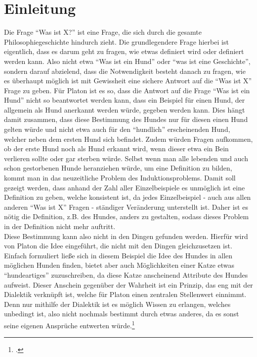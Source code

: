 \section{Einleitung}

Die Frage \enquote{Was ist X?} ist eine Frage, die sich durch die gesamte Philosophiegeschichte hindurch zieht. Die grundlegendere Frage hierbei ist eigentlich, dass es darum geht zu fragen, wie etwas definiert wird oder definiert werden kann. Also nicht etwa \enquote{Was ist ein Hund} oder \enquote{was ist eine Geschichte}, sondern darauf abzielend, dass die Notwendigkeit besteht danach zu fragen, wie es überhaupt möglich ist mit Gewissheit eine sichere Antwort auf die \enquote{Was ist X} Frage zu geben. Für Platon ist es so, dass die Antwort auf die Frage \enquote{Was ist ein Hund} nicht so beantwortet werden kann, dass ein Beispiel für einen Hund, der allgemein als Hund anerkannt werden würde, gegeben werden kann. Dies hängt damit zusammen, dass diese Bestimmung des Hundes nur für diesen einen Hund gelten würde und nicht etwa auch für den \enquote{hundlich} erscheinenden Hund, welcher neben dem ersten Hund sich befindet. Zudem würden Fragen aufkommen, ob der erste Hund noch als Hund erkannt wird, wenn dieser etwa ein Bein verlieren sollte oder gar sterben würde. Selbst wenn man alle lebenden und auch schon gestorbenen Hunde heranziehen würde, um eine Definition zu bilden, kommt man in das neuzeitliche Problem des Induktionsproblems. Damit soll gezeigt werden, dass anhand der Zahl aller Einzelbeispiele es unmöglich ist eine Definition zu geben, welche konsistent ist, da jedes Einzelbeispiel - auch aus allen anderen \enquote{Was ist X} Fragen - ständiger Veränderung unterstellt ist. Daher ist es nötig die Definition, z.B. des Hundes, anders zu gestalten, sodass dieses Problem in der Definition nicht mehr auftritt.\\
Diese Bestimmung kann also nicht in den Dingen gefunden werden. Hierfür wird von Platon die Idee eingeführt, die nicht mit den Dingen gleichzusetzen ist. Einfach formuliert ließe sich in diesem Beispiel die Idee des Hundes in allen möglichen Hunden finden, bietet aber auch Möglichkeiten einer Katze etwas \enquote{hundeartiges} zuzuschreiben, da diese Katze anscheinend Attribute des Hundes aufweist. Dieser Anschein gegenüber der Wahrheit ist ein Prinzip, das eng mit der Dialektik verknüpft ist, welche für Platon einen zentralen Stellenwert einnimmt. Denn nur mithilfe der Dialektik ist es möglich Wissen zu erlangen, welches unbedingt ist, also nicht nochmals bestimmt durch etwas anderes, da es sonst seine eigenen Ansprüche entwerten würde.\footcite[vgl.][S.83]{Staudacher} 
